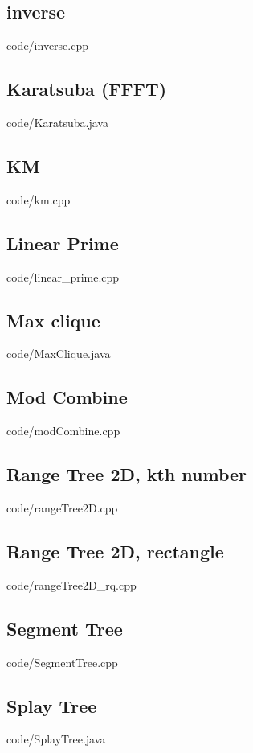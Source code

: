 \documentclass [landscape,10pt,a4paper,twocolumn,nofonts]{article}
\begin{document}
\subsection{inverse}
 {code/inverse.cpp}
\subsection{Karatsuba (FFFT)}
 {code/Karatsuba.java}
\subsection{KM}
 {code/km.cpp}
\subsection{Linear Prime}
 {code/linear_prime.cpp}
\subsection{Max clique}
 {code/MaxClique.java}
\subsection{Mod Combine}
 {code/modCombine.cpp}
\subsection{Range Tree 2D, kth number}
 {code/rangeTree2D.cpp}
\subsection{Range Tree 2D, rectangle}
 {code/rangeTree2D_rq.cpp}
\subsection{Segment Tree}
 {code/SegmentTree.cpp}
\subsection{Splay Tree}
 {code/SplayTree.java}
\end{document}
